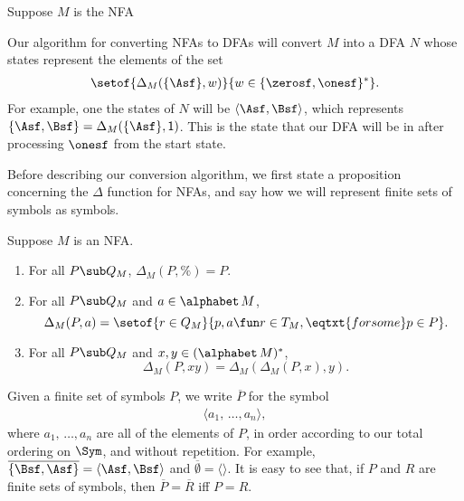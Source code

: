 Suppose $M$ is the NFA
\begin{center}

\end{center}
Our algorithm for converting NFAs to DFAs will convert $M$ into a DFA
$N$ whose states represent the elements of the set
\begin{gather*}
\setof{\Delta_M(\{\Asf\},w)}{w\in\{\zerosf,\onesf\}^*} .
\end{gather*}
For example, one the states of $N$ will be $\langle\Asf,\Bsf\rangle$,
which represents $\{\Asf,\Bsf\}=\Delta_M(\{\Asf\},\mathsf{1})$.
This is the state that our DFA will be in after processing $\onesf$
from the start state.

Before describing our conversion algorithm, we first state a
proposition concerning the $\Delta$ function for NFAs, and say how we
will represent finite sets of symbols as symbols.

\begin{proposition}
\label{NFADeltaProp}
Suppose $M$ is an NFA.
\begin{enumerate}[\quad(1)]
\item For all $P\sub Q_M$, $\Delta_M(P,\%)=P$.

\item For all $P\sub Q_M$ and $a\in\alphabet\,M$,
  \begin{displaymath}
    \Delta_M(P,a)=\setof{r\in Q_M}{p,a\fun r\in T_M,\eqtxt{for some}p\in P}.
  \end{displaymath}

\item For all $P\sub Q_M$ and $x,y\in(\alphabet\,M)^*$,
  \begin{displaymath}
    \Delta_M(P, xy)=\Delta_M(\Delta_M(P,x),y) .
  \end{displaymath}
\end{enumerate}
\end{proposition}

Given a finite set of symbols $P$, we write $\overline{P}$ for
the symbol
\begin{gather*}
\langle a_1,\,\ldots,a_n\rangle,
\end{gather*}
where $a_1,\,\ldots,a_n$ are all of the elements of $P$, in order
according to our total ordering on $\Sym$, and without repetition.  For
example, $\overline{\{\Bsf,\Asf\}}=\langle\Asf,\Bsf\rangle$ and
$\overline{\emptyset}=\langle\rangle$.
It is easy to see that, if $P$ and $R$ are finite sets of symbols, then
$\overline{P}=\overline{R}$ iff $P=R$.

